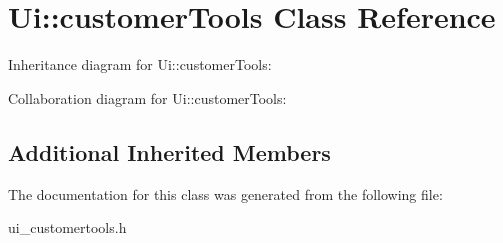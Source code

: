 \section{Ui\+:\+:customer\+Tools Class Reference}
\label{class_ui_1_1customer_tools}


Inheritance diagram for Ui\+:\+:customer\+Tools\+:


Collaboration diagram for Ui\+:\+:customer\+Tools\+:
\subsection*{Additional Inherited Members}


The documentation for this class was generated from the following file\+:\begin{DoxyCompactItemize}
\item 
ui\+\_\+customertools.\+h\end{DoxyCompactItemize}
